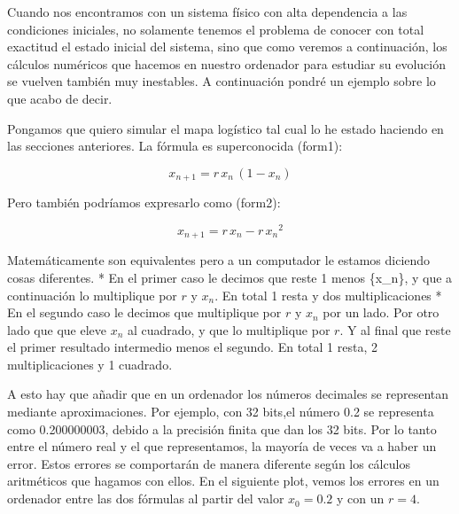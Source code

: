\documentclass[
  10pt,
  a4paper,
  DIV=11,
  numbers=noendperiod,
  open=any]{scrreprt}
\numberwithin{equation}{chapter}
\numberwithin{equation}{section}
\renewcommand{\[}{\begin{equation}}
\renewcommand{\]}{\end{equation}}
\begin{document}
Cuando nos encontramos con un sistema físico con alta dependencia a las
condiciones iniciales, no solamente tenemos el problema de conocer con
total exactitud el estado inicial del sistema, sino que como veremos a
continuación, los cálculos numéricos que hacemos en nuestro ordenador
para estudiar su evolución se vuelven también muy inestables. A
continuación pondré un ejemplo sobre lo que acabo de decir.

Pongamos que quiero simular el mapa logístico tal cual lo he estado
haciendo en las secciones anteriores. La fórmula es superconocida
(form1):

\begin{equation}
x_{n+1} = r\,x_n\,(1 - x_n)
\end{equation}

Pero también podríamos expresarlo como (form2):

\begin{equation}
x_{n+1} = r\,x_n - r\,{x_n}^2
\end{equation}

Matemáticamente son equivalentes pero a un computador le estamos
diciendo cosas diferentes. * En el primer caso le decimos que reste 1
menos \{x\_n\}, y que a continuación lo multiplique por \(r\) y \(x_n\).
En total 1 resta y dos multiplicaciones * En el segundo caso le decimos
que multiplique por \(r\) y \(x_n\) por un lado. Por otro lado que que
eleve \(x_n\) al cuadrado, y que lo multiplique por \(r\). Y al final
que reste el primer resultado intermedio menos el segundo. En total 1
resta, 2 multiplicaciones y 1 cuadrado.

A esto hay que añadir que en un ordenador los números decimales se
representan mediante aproximaciones. Por ejemplo, con 32 bits,el número
0.2 se representa como 0.200000003, debido a la precisión finita que dan
los 32 bits. Por lo tanto entre el número real y el que representamos,
la mayoría de veces va a haber un error. Estos errores se comportarán de
manera diferente según los cálculos aritméticos que hagamos con ellos.
En el siguiente plot, vemos los errores en un ordenador entre las dos
fórmulas al partir del valor \(x_0=0.2\) y con un \(r=4\).
\end{document}
